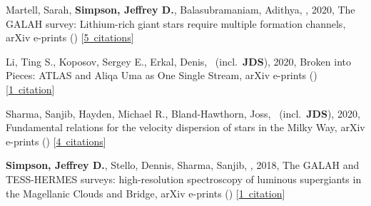 \item[{\color{numcolor}\scriptsize4}] Martell, Sarah, \textbf{Simpson, Jeffrey D.}, Balasubramaniam, Adithya, \etal, 2020, The GALAH survey: Lithium-rich giant stars require multiple formation channels, arXiv e-prints () [\href{https://ui.adsabs.harvard.edu/#abs/2020arXiv200602106M}{5~citations}]

\item[{\color{numcolor}\scriptsize3}] Li, Ting S., Koposov, Sergey E., Erkal, Denis, \etal\ (incl.\ \textbf{JDS}), 2020, Broken into Pieces: ATLAS and Aliqa Uma as One Single Stream, arXiv e-prints () [\href{https://ui.adsabs.harvard.edu/#abs/2020arXiv200610763L}{1~citation}]

\item[{\color{numcolor}\scriptsize2}] Sharma, Sanjib, Hayden, Michael R., Bland-Hawthorn, Joss, \etal\ (incl.\ \textbf{JDS}), 2020, Fundamental relations for the velocity dispersion of stars in the Milky Way, arXiv e-prints () [\href{https://ui.adsabs.harvard.edu/#abs/2020arXiv200406556S}{4~citations}]

\item[{\color{numcolor}\scriptsize1}] \textbf{Simpson, Jeffrey D.}, Stello, Dennis, Sharma, Sanjib, \etal, 2018, The GALAH and TESS-HERMES surveys: high-resolution spectroscopy of luminous supergiants in the Magellanic Clouds and Bridge, arXiv e-prints () [\href{https://ui.adsabs.harvard.edu/#abs/2018arXiv180405900S}{1~citation}]